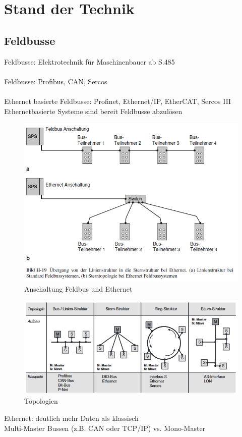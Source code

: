 \documentclass[ a4paper,
                oneside,
                toc=bibliography,
                toc=listof
                ]{scrbook}
\begin{document}
	\chapter{Stand der Technik}
	
	\section{Feldbusse}
	Feldbusse: Elektrotechnik für Maschinenbauer ab S.485\\
	\\
	Feldbusse: Profibus, CAN, Sercos
	\\
	\\	
	Ethernet basierte Feldbusse: Profinet, Ethernet/IP, EtherCAT, Sercos III \\
	Ethernetbasierte Systeme sind bereit Feldbusse abzulösen \\
	\begin{figure}[!ht]
		\centering
		\includegraphics[width=1.0\linewidth]{./images/Feldbus vs Ethernet Anschaltung.png}
		\caption{Anschaltung Feldbus und Ethernet \cite{hering2012elektrotechnik}}
		\label{fig:Anschaltung Bus}
	\end{figure}
	\begin{figure}[!ht]
		\centering
		\includegraphics[width=1.0\linewidth]{./images/Topologien.png}
		\caption{Topologien}
		\label{fig:Topologien}
	\end{figure}
	Ethernet: deutlich mehr Daten als klassisch \\
	Multi-Master Bussen (z.B. CAN oder TCP/IP) vs. Mono-Master
	
\end{document}

